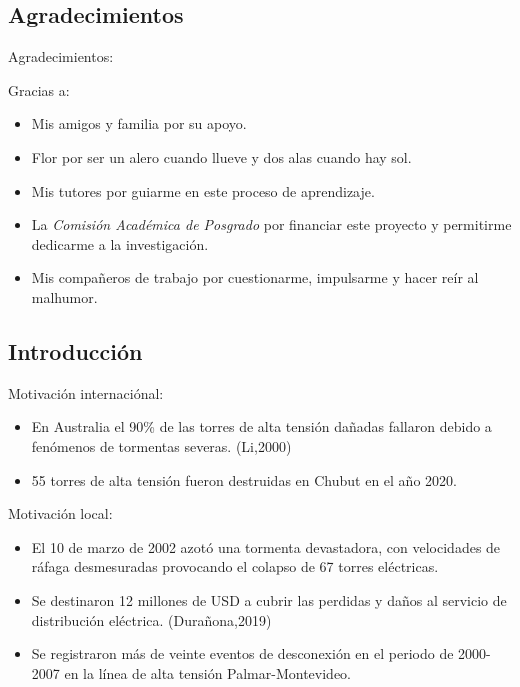 \documentclass[
  aspectratio=169,
]{beamer}
\begin{document}
\begin{small}
\subsection[Agradecimientos]{Agradecimientos}
\begin{frame}{Agradecimientos:}{}
	\begin{block}{Gracias a:}
	\begin{itemize}
		\item Mis amigos y familia por su apoyo.
		\pause 
		\item Flor por ser un alero cuando llueve y dos alas cuando hay sol. 
		\pause
		\item Mis tutores por guiarme en este proceso de aprendizaje.
		\pause
		\item La \emph{Comisión Académica de Posgrado} por financiar este proyecto y permitirme dedicarme a la investigación.
		\pause
		\item Mis compañeros de trabajo por cuestionarme, impulsarme y hacer reír al malhumor.  
	\end{itemize}
	\end{block}
\end{frame}
\subsection[Introducción]{Introducción}
\begin{frame}
	\begin{block}{Motivación internaciónal:}
		\begin{itemize}
			\item En Australia el 90\% de las torres de alta tensión dañadas fallaron debido a fenómenos de tormentas severas.  {\color{blue}(Li,2000)}
			\pause
			\item 55 torres de alta tensión fueron \alert{destruidas} en Chubut en el año 2020.
			\pause
		\end{itemize}
	\end{block}
	\vfill
	\begin{block}{Motivación local:}
		\begin{itemize}
			\item El 10 de marzo de 2002 azotó una tormenta devastadora, con velocidades de ráfaga desmesuradas provocando el \alert{colapso} de 67 torres eléctricas.
			\pause
			\item Se destinaron \alert{12 millones de USD} a cubrir las perdidas y daños al servicio de distribución eléctrica. {\color{blue}(Durañona,2019)}
			\pause
			\item Se registraron más de veinte eventos de desconexión en el periodo de 2000-2007 en la línea de alta tensión Palmar-Montevideo.
		\end{itemize}
	\end{block}
\end{frame}


\end{small}
\end{document}
